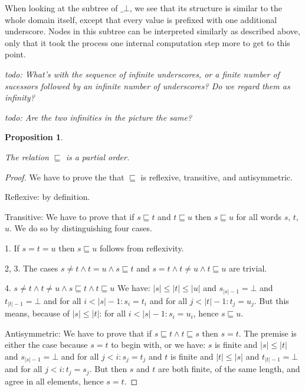 \documentclass[a4paper]{article}
\newcommand{\todo}[1]{\bigskip \noindent \emph{todo: #1}}
\newtheorem{thmPONuFisPartialOrder}[defNuF]{Proposition}
\begin{document}
When looking at the subtree of $\_\bot$, we see that its structure is similar
to the whole domain itself, except that every value is prefixed with one additional
underscore.  Nodes in this subtree can be interpreted similarly as described
above, only that it took the process one internal computation step more to
get to this point.

\todo{What's with the sequence of infinite underscores, or a finite number of
sucessors followed by an infinite number of underscores?  Do we regard them as
infinity?}

\todo{Are the two infinities in the picture the same?}

\begin{thmPONuFisPartialOrder}
\label{thmPONuFisPartialOrder}

The relation $\sqsubseteq$ is a partial order.

\end{thmPONuFisPartialOrder}


\begin{proof}

We have to prove the that $\sqsubseteq$ is reflexive, transitive, and
antisymmetric.

Reflexive: by definition.

Transitive: We have to prove that if $s \sqsubseteq t$ and $t \sqsubseteq u$
then $s \sqsubseteq u$ for all words $s$, $t$, $u$. We do so by distinguishing
four cases.

1. If $s = t = u$ then $s \sqsubseteq u$ follows from reflexivity.

2, 3. The cases $s \neq t \wedge t = u \wedge s \sqsubseteq t$ and $s = t
\wedge t \neq u \wedge t \sqsubseteq u$ are trivial.

4. $s \neq t \wedge t \neq u \wedge s \sqsubseteq t \wedge t \sqsubseteq u$ We
have: $|s| \leq |t| \leq |u|$ and $s_{|s|-1} = \bot$ and $t_{|t|-1} = \bot$ and
for all $i < |s|-1: s_i = t_i$ and for all $j < |t|-1: t_j = u_j$.  But this
means, because of $|s| \leq |t|$: for all $i < |s|-1: s_i = u_i$, hence $s
\sqsubseteq u$.

Antisymmetric: We have to prove that if $s \sqsubseteq t \wedge t \sqsubseteq
s$ then $s = t$.  The premise is either the case because $s = t$ to begin with,
or we have: $s$ is finite and $|s| \leq |t|$ and $s_{|s|-1} = \bot$ and for all $j <
i: s_j = t_j$ and $t$ is finite and $|t| \leq |s|$ and $t_{|t|-1} = \bot$ and for all
$j < i: t_j = s_j$.  But then $s$ and $t$ are both finite, of the same length,
and agree in all elements, hence $s = t$.

\end{proof}
\end{document}
